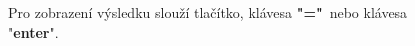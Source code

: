 \documentclass[12pt,czech]{article}
\begin{document}
 
\begin{figure}[h]
\centering
{}
\caption{Pro zobrazení výsledku slouží tlačítko, klávesa \textbf{"="}~nebo klávesa "\textbf{enter}".}
\end{figure}

\newpage
\end{document}
